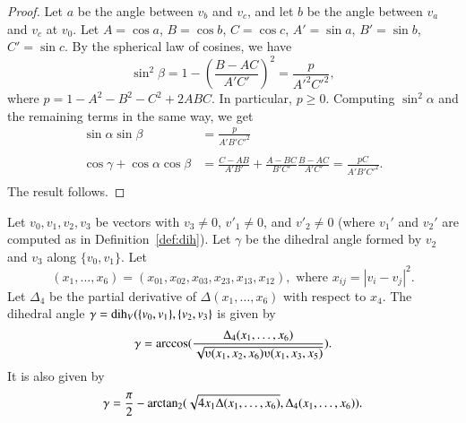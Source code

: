 \begin{proof}
Let $a$ be the angle between $v_b$ and $v_c$, and let $b$ be the angle
between $v_a$ and $v_c$ at $v_0$.
Let $A=\cos a$, $B=\cos b$, $C=\cos c$,
$A'=\sin a$, $B'=\sin b$, $C'=\sin c$.  By the
spherical law of cosines, we have
   $$\sin^2\beta = 1-\left(\frac{B-A C}{A' C'}\right)^2
     = \frac{p}{A'^2 C'^2},$$
where $p=1-A^2 - B^2 - C^2 + 2 A B C$.
In particular, $p\ge 0$.
Computing $\sin^2\alpha$ and the remaining terms in the same way, we get
   $$
   \begin{array}{lll}
     \sin\alpha\sin\beta &= \frac{p}{A' B' C'^2}\\ 
      \\
     \cos\gamma + \cos\alpha \cos\beta &=
         \frac{C - A B}{A' B'} + \frac{A - B C}{B' C'} \frac{B - A C}{A' C'}
         = \frac{p C}{A' B' C'^2}.\\
   \end{array}
   $$
The result follows.
\end{proof}




\begin{lemma} \label{lemma:dihform} Let $v_0,v_1,v_2,v_3$ 
be vectors with $v_3\ne0$, $v'_1\ne 0$, and $v'_2 \ne 0$ (where $v_1'$ and
$v_2'$ are computed as in Definition~\ref{def:dih}).  
Let $\gamma$ be the dihedral angle formed
by $v_2$ and $v_3$ along $\{v_0,v_1\}$. Let
    $$(x_1,\ldots,x_6) = 
    (x_{01},x_{02},x_{03},x_{23},x_{13},x_{12}),
    \text{ where } x_{ij}=|v_i-v_j|^2.$$
Let $\Delta_4$ be the partial derivative of $\Delta(x_1,\ldots,x_6)$ with
respect to $x_4$.
The dihedral angle $\gamma=\operatorname{dih}_V(\{v_0,v_1\},\{v_2,v_3\}$
is given by
    $$
    \gamma=\arccos(\frac{\Delta_4(x_1,\ldots,x_6)}{\sqrt{
    \ups(x_1,x_2,x_6)\ups(x_1,x_3,x_5)}}).
    $$
It is also given by
    $$
    \gamma=\frac{\pi}{2} - {\operatorname{arctan_2}}
     ({\sqrt{4 x_1 \Delta(x_1,\ldots,x_6)}},{\Delta_4(x_1,\ldots,x_6)}).
    $$
\end{lemma}

